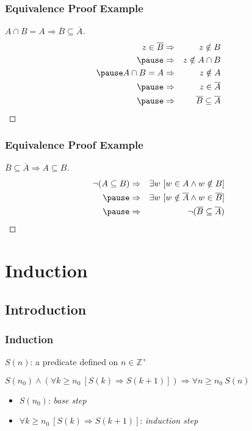 \documentclass[dvipsnames]{beamer}
\begin{document}
\begin{frame}
  \frametitle{Equivalence Proof Example}

  \begin{proof}[$A \cap B = A \Rightarrow \overline{B} \subseteq \overline{A}$]
    \begin{eqnarray*}
      z \in \overline{B} & \Rightarrow & z \notin B\\\pause
                         & \Rightarrow & z \notin A \cap B\\\pause
      A \cap B = A       & \Rightarrow & z \notin A\\\pause
                         & \Rightarrow & z \in \overline{A}\\\pause
                         & \Rightarrow & \overline{B} \subseteq \overline{A}
    \end{eqnarray*}
  \end{proof}
\end{frame}

\begin{frame}
  \frametitle{Equivalence Proof Example}

  \begin{proof}[$\overline{B} \subseteq \overline{A} \Rightarrow A \subseteq B$]
    \begin{eqnarray*}
      \neg(A \subseteq B)
        & \Rightarrow & \exists w~[w \in A \wedge w \notin B]\\\pause
        & \Rightarrow & \exists w~[w \notin \overline{A} \wedge w \in \overline{B}]\\\pause
        & \Rightarrow & \neg(\overline{B} \subseteq \overline{A})
    \end{eqnarray*}
  \end{proof}
\end{frame}

\section{Induction}

\subsection{Introduction}

\begin{frame}
  \frametitle{Induction}

  \begin{definition}
    $S(n)$: a predicate defined on $n \in \mathbb{Z}^+$

    \pause
    \medskip
    $S(n_0) \wedge (\forall k \geq n_0~[S(k) \Rightarrow S(k+1)])
      \Rightarrow \forall n \geq n_0~S(n)$
  \end{definition}

  \pause
  \medskip
  \begin{itemize}
    \item $S(n_0)$: \emph{base step}
    \item $\forall k \geq n_0~[S(k) \Rightarrow S(k+1)]$: \emph{induction step}
  \end{itemize}
\end{frame}
\end{document}
